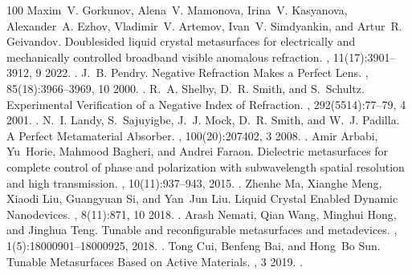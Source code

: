 \documentclass[a4paper,10pt,english,openany,oneside]{jupyterBook}
\begin{document}
\begin{sphinxthebibliography}{100}
\sphinxAtStartPar
Maxim V. Gorkunov, Alena V. Mamonova, Irina V. Kasyanova, Alexander A. Ezhov, Vladimir V. Artemov, Ivan V. Simdyankin, and Artur R. Geivandov. Double\sphinxhyphen{}sided liquid crystal metasurfaces for electrically and mechanically controlled broadband visible anomalous refraction. , 11(17):3901–3912, 9 2022. .
\sphinxAtStartPar
J. B. Pendry. Negative Refraction Makes a Perfect Lens. , 85(18):3966–3969, 10 2000. .
\sphinxAtStartPar
R. A. Shelby, D. R. Smith, and S. Schultz. Experimental Verification of a Negative Index of Refraction. , 292(5514):77–79, 4 2001. .
\sphinxAtStartPar
N. I. Landy, S. Sajuyigbe, J. J. Mock, D. R. Smith, and W. J. Padilla. A Perfect Metamaterial Absorber. , 100(20):207402, 3 2008. .
\sphinxAtStartPar
Amir Arbabi, Yu Horie, Mahmood Bagheri, and Andrei Faraon. Dielectric metasurfaces for complete control of phase and polarization with subwavelength spatial resolution and high transmission. , 10(11):937–943, 2015. .
\sphinxAtStartPar
Zhenhe Ma, Xianghe Meng, Xiaodi Liu, Guangyuan Si, and Yan Jun Liu. Liquid Crystal Enabled Dynamic Nanodevices. , 8(11):871, 10 2018. .
\sphinxAtStartPar
Arash Nemati, Qian Wang, Minghui Hong, and Jinghua Teng. Tunable and reconfigurable metasurfaces and metadevices. , 1(5):18000901–18000925, 2018. .
\sphinxAtStartPar
Tong Cui, Benfeng Bai, and Hong Bo Sun. Tunable Metasurfaces Based on Active Materials. , 3 2019. .

\end{sphinxthebibliography}
\end{document}
